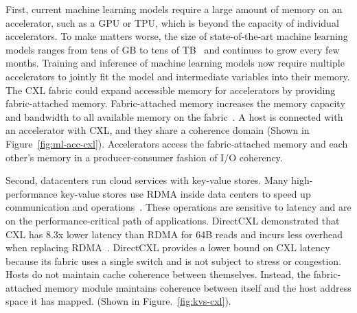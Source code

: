 %
%

First, current machine learning models require a large amount of memory on an accelerator, such as a GPU or TPU, which is beyond the capacity of individual accelerators.
%
To make matters worse, the size of state-of-the-art machine learning models ranges from tens of GB to tens of TB~\cite{zero:arxiv:2020, zero-infinity:sc:2021, zionex:isca:2022} and continues to grow every few months.
%
Training and inference of machine learning models now require multiple accelerators to jointly fit the model and intermediate variables into their memory.
%
The CXL fabric could expand accessible memory for accelerators by providing fabric-attached memory.
%
Fabric-attached memory increases the memory capacity and bandwidth to all available memory on the fabric~\cite{cxl-3-0-spec, samsung-memory-expander:hcs:2022, memory-scalability:microchip}.
%
%
A host is connected with an accelerator with CXL, and they share a coherence domain (Shown in Figure~\ref{fig:ml-acc-cxl}).   
%
Accelerators access the fabric-attached memory and each other's memory in a producer-consumer fashion of I/O coherency.
%

Second, datacenters run cloud services with key-value stores.
%
Many high-performance key-value stores use RDMA inside data centers to speed up communication and operations~\cite{farm:nsdi:2014, herd:sigcomm:2014, eRPC:nsdi:2019, xstore:osdi:2020}.
%
These operations are sensitive to latency and are on the performance-critical path of applications.
%
DirectCXL demonstrated that CXL has 8.3x lower latency than RDMA for 64B reads and incurs less overhead when replacing RDMA~\cite{directcxl:atc:2022}.
%
DirectCXL provides a lower bound on CXL latency because its fabric uses a single switch and is not subject to stress or congestion.
%
Hosts do not maintain cache coherence between themselves. 
%
Instead, the fabric-attached memory module maintains coherence between itself and the host address space it has mapped. (Shown in Figure.~\ref{fig:kvs-cxl}).


